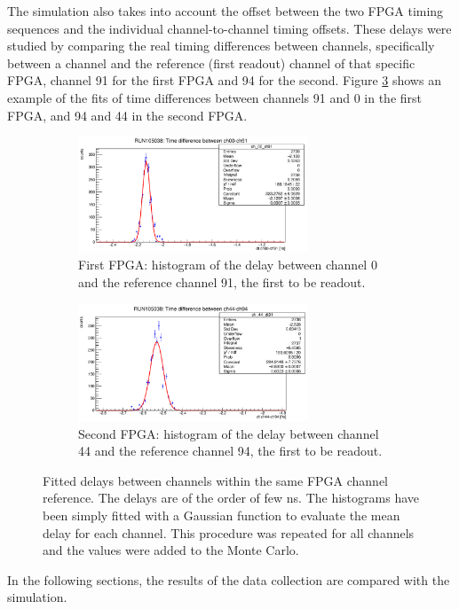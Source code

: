 The simulation also takes into account the offset between the two FPGA timing sequences and the 
individual channel-to-channel timing offsets. These delays were studied by comparing the real timing 
differences between channels, specifically between a channel and the reference (first readout) channel of that 
specific FPGA, channel 91 for the first FPGA and 94 for the second. Figure \ref{fig:delaychannels} 
shows an example of the fits of time differences between channels 91 and 0 in the first FPGA, and 94 and 44 in the second FPGA. 

\begin{figure}[!h]
  \centering
  \begin{subfigure}[b]{\textwidth}
      \centering
      \includegraphics[width=0.75\textwidth]{figures/png/Screenshot from 2023-12-03 11-50-50.png}
      \caption{First FPGA: histogram of the delay between channel 0 and the reference channel 91, the first to be readout.}
      \label{fig:delay1}
  \end{subfigure}
  \hfill
  \begin{subfigure}[b]{\textwidth}
      \centering
      \includegraphics[width=0.75\textwidth]{figures/png/Screenshot from 2023-12-03 11-50-33.png}
      \caption{Second FPGA: histogram of the delay between channel 44 and the reference channel 94, the first to be readout.}
      \label{fig:delay2}
  \end{subfigure}
     \caption{Fitted delays between channels within the same FPGA channel reference. The delays are of the order of few ns. 
     The histograms have been simply fitted with a Gaussian function to evaluate the mean delay for each channel. This procedure was repeated for all channels and 
     the values were added to the Monte Carlo.}
     \label{fig:delaychannels}
\end{figure}
In the following sections, the results of the data collection are compared with the simulation.


